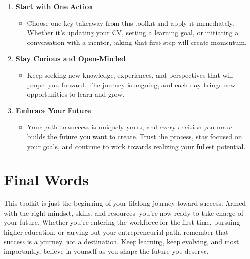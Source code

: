 \documentclass[
  letterpaper,
  DIV=11,
  numbers=noendperiod]{scrreprt}
\providecommand{\tightlist}{%
  \setlength{\itemsep}{0pt}\setlength{\parskip}{0pt}}\usepackage{longtable,booktabs,array}
\begin{document}
\begin{enumerate}
\def\labelenumi{\arabic{enumi}.}
\item
  \textbf{Start with One Action}

  \begin{itemize}
  \tightlist
  \item
    Choose one key takeaway from this toolkit and apply it immediately.
    Whether it's updating your CV, setting a learning goal, or
    initiating a conversation with a mentor, taking that first step will
    create momentum.
  \end{itemize}
\item
  \textbf{Stay Curious and Open-Minded}

  \begin{itemize}
  \tightlist
  \item
    Keep seeking new knowledge, experiences, and perspectives that will
    propel you forward. The journey is ongoing, and each day brings new
    opportunities to learn and grow.
  \end{itemize}
\item
  \textbf{Embrace Your Future}

  \begin{itemize}
  \tightlist
  \item
    Your path to success is uniquely yours, and every decision you make
    builds the future you want to create. Trust the process, stay
    focused on your goals, and continue to work towards realizing your
    fullest potential.
  \end{itemize}
\end{enumerate}


\chapter*{Final Words}\label{final-words}


This toolkit is just the beginning of your lifelong journey toward
success. Armed with the right mindset, skills, and resources, you're now
ready to take charge of your future. Whether you're entering the
workforce for the first time, pursuing higher education, or carving out
your entrepreneurial path, remember that success is a journey, not a
destination. Keep learning, keep evolving, and most importantly, believe
in yourself as you shape the future you deserve.
\end{document}
